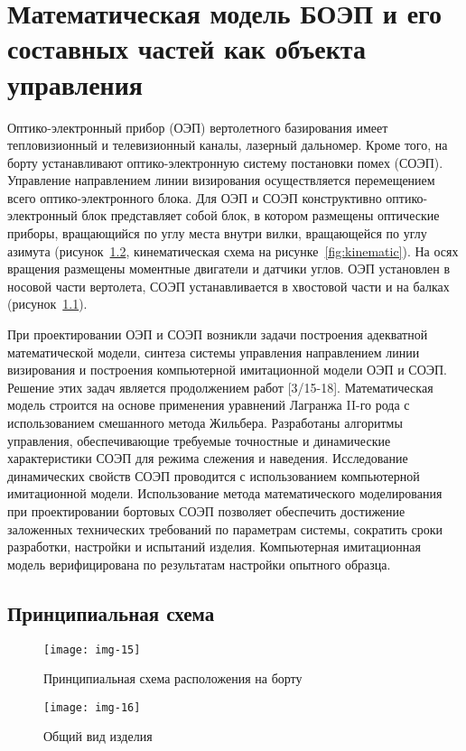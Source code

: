 \chapter{Математическая модель БОЭП и его составных частей как объекта управления} \label{ch:ch3}

Оптико-электронный прибор (ОЭП) вертолетного базирования имеет тепловизионный и телевизионный каналы, лазерный дальномер. Кроме того, на борту устанавливают оптико-электронную систему постановки помех (СОЭП). Управление направлением линии визирования осуществляется перемещением всего оптико-электронного блока. Для ОЭП и СОЭП конструктивно оптико-электронный блок представляет собой блок, в котором размещены оптические приборы, вращающийся по углу места внутри вилки, вращающейся по углу азимута 
(рисунок~\ref{fig:device}, кинематическая схема на рисунке~\ref{fig:kinematic}). 
На осях вращения размещены моментные двигатели и датчики углов. ОЭП установлен в носовой части вертолета, СОЭП устанавливается в хвостовой части и на балках 
(рисунок~\ref{fig:helicopter}).

При проектировании ОЭП и СОЭП возникли задачи построения адекватной математической модели, синтеза системы управления направлением линии визирования и построения компьютерной имитационной модели ОЭП и СОЭП. Решение этих задач является продолжением работ [3/15-18]. Математическая модель строится на основе применения уравнений Лагранжа II-го рода с использованием смешанного метода Жильбера. Разработаны алгоритмы управления, обеспечивающие требуемые точностные и динамические характеристики СОЭП для режима слежения и наведения. Исследование динамических свойств СОЭП проводится с использованием компьютерной имитационной модели. Использование метода математического моделирования при проектировании бортовых СОЭП позволяет обеспечить достижение заложенных технических требований по параметрам системы, сократить сроки разработки, настройки и испытаний изделия. Компьютерная имитационная модель верифицирована по результатам настройки опытного образца.

\begin{landscape}
\section{Принципиальная схема} \label{ch:ch3/sect1}

\begin{figure}[ht]
	\centering
	\texttt{[image: img-15]} 
	\caption{Принципиальная схема расположения на борту}
	\label{fig:helicopter}
\end{figure}

\begin{figure}[ht]
	\centering
	\texttt{[image: img-16]} 
	\caption{Общий вид изделия}
	\label{fig:device}
\end{figure}
\end{landscape}

